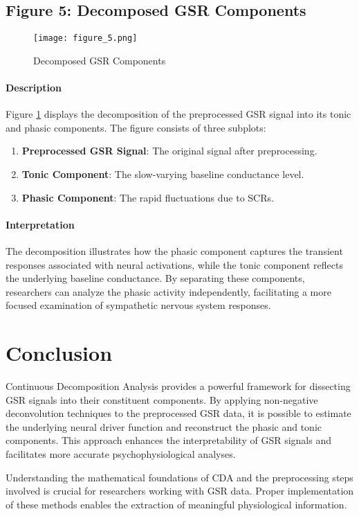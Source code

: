 \documentclass[twocolumn]{article}
\begin{document}
\subsection*{Figure 5: Decomposed GSR Components}

\begin{figure}[H]
\centering
\texttt{[image: figure\_5.png]}
\caption{Decomposed GSR Components}
\label{fig:decomposed_components}
\end{figure}

\paragraph{Description}

Figure \ref{fig:decomposed_components} displays the decomposition of the preprocessed GSR signal into its tonic and phasic components. The figure consists of three subplots:

\begin{enumerate}
    \item \textbf{Preprocessed GSR Signal}: The original signal after preprocessing.
    \item \textbf{Tonic Component}: The slow-varying baseline conductance level.
    \item \textbf{Phasic Component}: The rapid fluctuations due to SCRs.
\end{enumerate}

\paragraph{Interpretation}

The decomposition illustrates how the phasic component captures the transient responses associated with neural activations, while the tonic component reflects the underlying baseline conductance. By separating these components, researchers can analyze the phasic activity independently, facilitating a more focused examination of sympathetic nervous system responses.

\section*{Conclusion}

Continuous Decomposition Analysis provides a powerful framework for dissecting GSR signals into their constituent components. By applying non-negative deconvolution techniques to the preprocessed GSR data, it is possible to estimate the underlying neural driver function and reconstruct the phasic and tonic components. This approach enhances the interpretability of GSR signals and facilitates more accurate psychophysiological analyses.

Understanding the mathematical foundations of CDA and the preprocessing steps involved is crucial for researchers working with GSR data. Proper implementation of these methods enables the extraction of meaningful physiological information.


\end{document}
